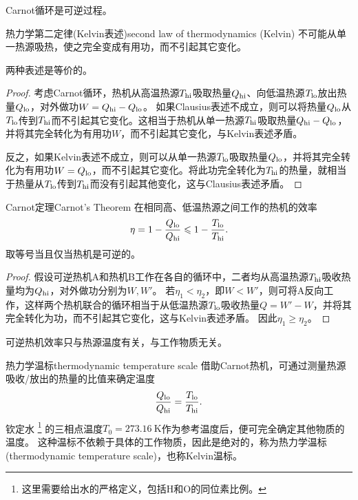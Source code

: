 \begin{corollary}
	Carnot循环是可逆过程。
\end{corollary}

\begin{theorem}{热力学第二定律(Kelvin表述)}{second law of thermodynamics (Kelvin)}
	不可能从单一热源吸热，使之完全变成有用功，而不引起其它变化。
\end{theorem}

\begin{corollary}
	两种表述是等价的。
\end{corollary}

\begin{proof}
	考虑Carnot循环，热机从高温热源$T_{\mathrm{hi}}$吸取热量$Q_{\mathrm{hi}}$、向低温热源$T_{\mathrm{lo}}$放出热量$Q_{\mathrm{lo}}$，对外做功$W=Q_{\mathrm{hi}}-Q_{\mathrm{lo}}$。
	如果Clausius表述不成立，则可以将热量$Q_{\mathrm{lo}}$从$T_{\mathrm{lo}}$传到$T_{\mathrm{hi}}$而不引起其它变化。这相当于热机从单一热源$T_{\mathrm{hi}}$吸取热量$Q_{\mathrm{hi}}-Q_{\mathrm{lo}}$，并将其完全转化为有用功$W$，而不引起其它变化，与Kelvin表述矛盾。

	反之，如果Kelvin表述不成立，则可以从单一热源$T_{\mathrm{lo}}$吸取热量$Q_{\mathrm{lo}}$，并将其完全转化为有用功$W=Q_{\mathrm{lo}}$，而不引起其它变化。将此功完全转化为$T_{\mathrm{hi}}$的热量，就相当于热量从$T_{\mathrm{lo}}$传到$T_{\mathrm{hi}}$而没有引起其他变化，这与Clausius表述矛盾。
\end{proof}

\begin{theorem}{Carnot定理}{Carnot's Theorem}
	在相同高、低温热源之间工作的热机的效率
	\begin{equation}
		\eta=1-\frac{Q_{\mathrm{lo}}}{Q_{\mathrm{hi}}}\leqslant1-\frac{T_{\mathrm{lo}}}{T_{\mathrm{hi}}}.
	\end{equation}
	取等号当且仅当热机是可逆的。
\end{theorem}

\begin{proof}
	假设可逆热机A和热机B工作在各自的循环中，二者均从高温热源$T_{\mathrm{hi}}$吸收热量均为$Q_{\mathrm{hi}}$，对外做功分别为$W,W'$。
	若$\eta_1<\eta_2$，即$W<W'$，则可将A反向工作，这样两个热机联合的循环相当于从低温热源$T_{\mathrm{lo}}$吸收热量$Q=W'-W$，并将其完全转化为功，而不引起其它变化，这与Kelvin表述矛盾。
	因此$\eta_1\geq\eta_2$。
\end{proof}

\begin{corollary}
	可逆热机效率只与热源温度有关，与工作物质无关。
\end{corollary}

\begin{definition}
	{热力学温标}{thermodynamic temperature scale}
	借助Carnot热机，可通过测量热源吸收/放出的热量的比值来确定温度
	\[
		\frac{Q_{\mathrm{lo}}}{Q_{\mathrm{hi}}}=\frac{T_{\mathrm{lo}}}{T_{\mathrm{hi}}}.
	\]
	钦定水
	\footnote{这里需要给出水的严格定义，包括H和O的同位素比例。
	}
	的三相点温度$T_0=\SI{273.16}{\kelvin}$作为参考温度后，便可完全确定其他物质的温度。
	这种温标不依赖于具体的工作物质，因此是绝对的，称为热力学温标(thermodynamic temperature scale)，也称Kelvin温标。
\end{definition}

